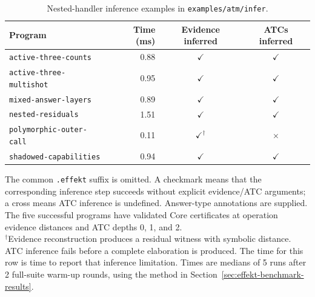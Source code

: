\begin{table}[htbp]
  \centering
  \caption{Nested-handler inference examples in \texttt{examples/atm/infer}.}
  \label{tab:effekt-inference}
  \small
  \begin{tabular}{@{}lrcc@{}}
    \toprule
    Program & Time (ms) & Evidence inferred & ATCs inferred \\
    \midrule
    \texttt{active-three-counts} & 0.88 & $\checkmark$ & $\checkmark$ \\
    \texttt{active-three-multishot} & 0.95 & $\checkmark$ & $\checkmark$ \\
    \texttt{mixed-answer-layers} & 0.89 & $\checkmark$ & $\checkmark$ \\
    \texttt{nested-residuals} & 1.51 & $\checkmark$ & $\checkmark$ \\
    \texttt{polymorphic-outer-call} & 0.11 & $\checkmark^{\dagger}$ & $\times$ \\
    \texttt{shadowed-capabilities} & 0.94 & $\checkmark$ & $\checkmark$ \\
    \bottomrule
  \end{tabular}
  \par\medskip
  \begin{minipage}{0.94\textwidth}
    \small
    The common \texttt{.effekt} suffix is omitted. A checkmark means that
    the corresponding inference step succeeds without explicit evidence/ATC arguments;
    a cross means ATC inference is undefined. Answer-type annotations are supplied.
    The five successful programs have validated Core certificates at operation
    evidence distances and ATC depths 0, 1, and 2.\\[0.4em]
    $^{\dagger}$Evidence reconstruction produces a residual witness with symbolic
    distance. ATC inference fails before a complete elaboration is produced.
    The time for this row is time to report that inference limitation.
    Times are medians of 5 runs after 2 full-suite warm-up rounds, using the method in Section~\ref{sec:effekt-benchmark-results}.
  \end{minipage}
\end{table}
